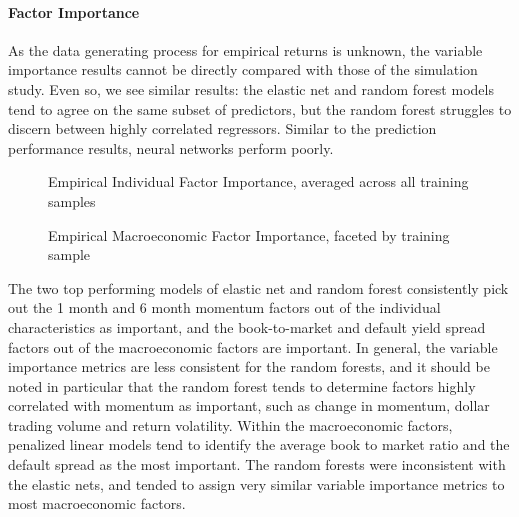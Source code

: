 \documentclass{article}
\begin{document}

\paragraph{Factor Importance}

As the data generating process for empirical returns is unknown, the variable importance results cannot be directly compared with those of the simulation study. Even so, we see similar results: the elastic net and random forest models tend to agree on the same subset of predictors, but the random forest struggles to discern between highly correlated regressors. Similar to the prediction performance results, neural networks perform poorly.

\begin{figure}[!htb]
	\centering
	\caption{Empirical Individual Factor Importance, averaged across all training samples}
\end{figure}

\begin{figure}[!htb]
	\label{empirical_macro_facet}
	\centering
	\caption{Empirical Macroeconomic Factor Importance, faceted by training sample}
\end{figure}

The two top performing models of elastic net and random forest consistently pick out the 1 month and 6 month momentum factors out of the individual characteristics as important, and the book-to-market and default yield spread factors out of the macroeconomic factors are important. In general, the variable importance metrics are less consistent for the random forests, and it should be noted in particular that the random forest tends to determine factors highly correlated with momentum as important, such as change in momentum, dollar trading volume and return volatility. Within the macroeconomic factors, penalized linear models tend to identify the average book to market ratio and the default spread as the most important. The random forests were inconsistent with the elastic nets, and tended to assign very similar variable importance metrics to most macroeconomic factors.
\end{document}
